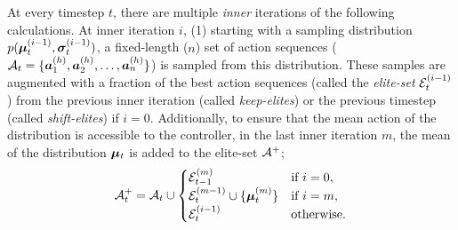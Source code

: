 At every timestep \(t\), there are multiple \emph{inner} iterations of the following calculations.
At inner iteration \(i\),
(1) starting with a sampling distribution \( p(\bm{\mu}_{t}^{(i - 1)},\bm{\sigma}_{t}^{(i - 1)} )\), a fixed-length (\(n\)) set of action sequences (\(\mathcal{A}_t = \{ \bm{a}^{(h)}_1, \bm{a}^{(h)}_2, \ldots, \bm{a}^{(h)}_{n} \}\)) is sampled from this distribution.
These samples are augmented with a fraction of the best action sequences (called the \emph{elite-set} \(\mathcal{E}_t^{(i - 1)}\)) from the previous inner iteration (called \emph{keep-elites}) or the previous timestep (called \emph{shift-elites}) if \(i = 0\). 
Additionally, to ensure that the mean action of the distribution is accessible to the controller, in the last inner iteration \(m\), the mean of the distribution \(\bm{\mu}_t\) is added to the elite-set \(\mathcal{A}^+\);
\begin{equation}
    \label{eq:icem-augment}
    \mathcal{A}^+_t = \mathcal{A}_t \cup \begin{cases}
            \mathcal{E}_{t - 1}^{(m)} & \text{if } i = 0,\\
            \mathcal{E}_t^{(m - 1)} \cup \{ \bm{\mu}_t^{(m)} \} & \text{if } i = m,\\
            \mathcal{E}_t^{(i - 1)} & \text{otherwise}.
    \end{cases}
\end{equation}


